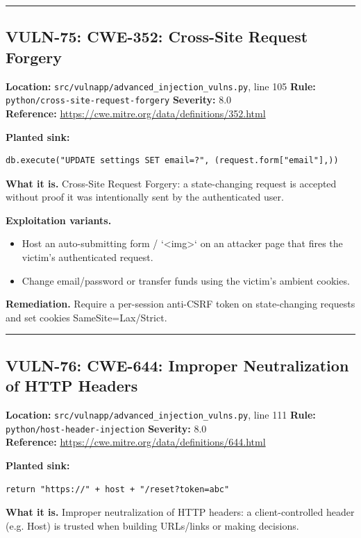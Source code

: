 \documentclass[11pt,a4paper]{article}
\begin{document}
\vspace{4pt}\hrule\vspace{6pt}
\subsection{VULN-75: CWE-352: Cross-Site Request Forgery}
\noindent\textbf{Location:} \texttt{src/vulnapp/advanced\_injection\_vulns.py}, line 105 \quad \textbf{Rule:} \texttt{python/cross-site-request-forgery} \quad \textbf{Severity:} 8.0
\\ \textbf{Reference:} \url{https://cwe.mitre.org/data/definitions/352.html}

\noindent\textbf{Planted sink:}
\begin{lstlisting}
db.execute("UPDATE settings SET email=?", (request.form["email"],))
\end{lstlisting}
\noindent\textbf{What it is.} Cross-Site Request Forgery: a state-changing request is accepted without proof it was intentionally sent by the authenticated user.

\noindent\textbf{Exploitation variants.}
\begin{itemize}[leftmargin=1.4em,itemsep=1pt,topsep=2pt]
\item Host an auto-submitting form / `<img>` on an attacker page that fires the victim's authenticated request.
\item Change email/password or transfer funds using the victim's ambient cookies.
\end{itemize}
\noindent\textbf{Remediation.} Require a per-session anti-CSRF token on state-changing requests and set cookies SameSite=Lax/Strict.

\vspace{4pt}\hrule\vspace{6pt}
\subsection{VULN-76: CWE-644: Improper Neutralization of HTTP Headers}
\noindent\textbf{Location:} \texttt{src/vulnapp/advanced\_injection\_vulns.py}, line 111 \quad \textbf{Rule:} \texttt{python/host-header-injection} \quad \textbf{Severity:} 8.0
\\ \textbf{Reference:} \url{https://cwe.mitre.org/data/definitions/644.html}

\noindent\textbf{Planted sink:}
\begin{lstlisting}
return "https://" + host + "/reset?token=abc"
\end{lstlisting}
\noindent\textbf{What it is.} Improper neutralization of HTTP headers: a client-controlled header (e.g. Host) is trusted when building URLs/links or making decisions.
\end{document}
